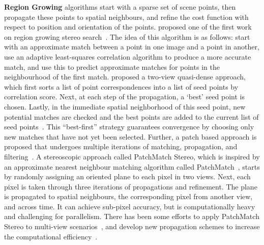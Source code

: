 
\textbf{Region Growing} algorithms start with a sparse set of scene points, then propagate these points to spatial neighbours, and refine the cost function with respect to position and orientation of the points. \citeauthor{otto1989region} proposed one of the first work on region growing stereo search~\cite{otto1989region}. The idea of this algorithm is as follows: start with an approximate match between a point in one image and a point in another, use an adaptive least-squares correlation algorithm to produce a more accurate match, and use this to predict approximate matches for points in the neighbourhood of the first match. \citeauthor{lhuillier2002match} proposed a two-view quasi-dense approach, which first sorts a list of point correspondences into a list of seed points by correlation score. Next, at each step of the propagation, a `best' seed point is chosen. Lastly, in the immediate spatial neighborhood of this seed point, new potential matches are checked and the best points are added to the current list of seed points~\cite{lhuillier2002match,lhuillier2005quasi}. This ``best-first'' strategy guarantees convergence by choosing only new matches that have not yet been selected. Further, a patch based approach is proposed that undergoes multiple iterations of matching, propagation, and filtering~\cite{furukawa2010accurate}. A stereoscopic approach called PatchMatch Stereo, which is inspired by an approximate nearest neighbour matching algorithm called PatchMatch~\cite{Barnes:2009:PAR}, starts by randomly assigning an oriented plane to each pixel in two views. Next, each pixel is taken through three iterations of propagations and refinement. The plane is propagated to spatial neighbours, the corresponding pixel from another view, and across time. It can achieve sub-pixel accuracy, but is computationally heavy and challenging for parallelism. There has been some efforts to apply PatchMatch Stereo to multi-view scenarios~\cite{galliani2015massively,uh2014efficient,zheng2014patchmatch}, and develop new propagation schemes to increase the computational efficiency~\cite{galliani2015massively}.

